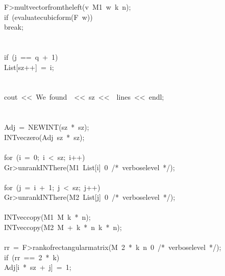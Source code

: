 \begin{tabbing}
\>\>\>F>multvectorfromtheleft(v\ M1\ w\ k\ n);\\[0pt]
\>\>\>if\ (evaluatecubicform(F\ w))\ \\[0pt]
\>\>\>\>break;\\[0pt]
\>\>\>\>\\[0pt]
\>\>\>\\[0pt]
\>\>if\ (j\ ==\ q\ +\ 1)\ \\[0pt]
\>\>\>List[sz++]\ =\ i;\\[0pt]
\>\>\>\ \\[0pt]
\>\>\\[0pt]
\>cout\ <<\ We\ found\ \ <<\ sz\ <<\ \ lines\ <<\ endl;\\[0pt]
\>\\[0pt]
\\[0pt]
\>Adj\ =\ NEWINT(sz\ *\ sz);\\[0pt]
\>INTveczero(Adj\ sz\ *\ sz);\\[0pt]
\\[0pt]
\>for\ (i\ =\ 0;\ i\ <\ sz;\ i++)\ \\[0pt]
\>\>Gr>unrankINThere(M1\ List[i]\ 0\ /*\ verboselevel\ */);\\[0pt]
\\[0pt]
\>\>for\ (j\ =\ i\ +\ 1;\ j\ <\ sz;\ j++)\ \\[0pt]
\>\>\>Gr>unrankINThere(M2\ List[j]\ 0\ /*\ verboselevel\ */);\\[0pt]
\\[0pt]
\>\>\>INTveccopy(M1\ M\ k\ *\ n);\\[0pt]
\>\>\>INTveccopy(M2\ M\ +\ k\ *\ n\ k\ *\ n);\\[0pt]
\\[0pt]
\>\>\>rr\ =\ F>rankofrectangularmatrix(M\ 2\ *\ k\ n\ 0\ /*\ verboselevel\ */);\\[0pt]
\>\>\>if\ (rr\ ==\ 2\ *\ k)\ \\[0pt]
\>\>\>\>Adj[i\ *\ sz\ +\ j]\ =\ 1;\\[0pt]

\end{tabbing}
